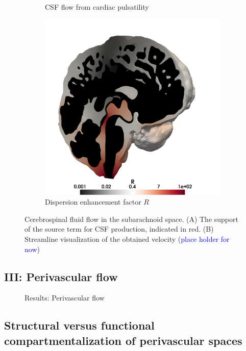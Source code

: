 \documentclass[fleqn,10pt]{wlscirep}
\newcommand{\rami}[1]{\textcolor{blue}{#1}}
\newcommand{\draft}[1]{\textcolor{gray}{#1}}
\begin{document}
\begin{figure}[h!]
\begin{subfigure}[b]{0.33\textwidth}
\caption{CSF flow  from cardiac pulsatility}
\label{fig:csf_flow_cardiac}
\end{subfigure}
\begin{subfigure}[b]{0.33\textwidth}
\includegraphics[width = 1 \textwidth]{figures/R.png} 
\caption{Dispersion enhancement factor $R$}
\label{fig:visualize_R}
\end{subfigure}
 \caption{Cerebrospinal fluid flow in the subarachnoid space. (A) The support of the source term for CSF production, indicated in red. (B) Streamline visualization of the obtained velocity (\rami{place holder for now}) }
\end{figure}  

\subsection*{III: Perivascular flow}

\draft{\lipsum[1]}

\begin{figure}
  \vspace{10em}
  \caption{Results: Perivascular flow}
  \label{fig:pvs}
\end{figure}

\subsection*{Structural versus functional compartmentalization of perivascular spaces}
\end{document}
